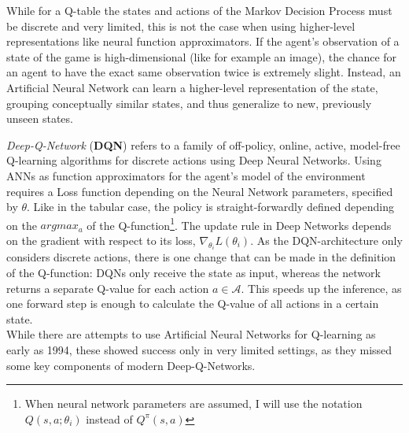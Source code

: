 While for a Q-table the states and actions of the Markov Decision Process must be discrete and very limited, this is not the case when using higher-level representations like neural function approximators. If the agent's observation of a state of the game is high-dimensional (like for example an image), the chance for an agent to have the exact same observation twice is extremely slight. Instead, an Artificial Neural Network can learn a higher-level representation of the state, grouping conceptually similar states, and thus generalize to new, previously unseen states. 

\textit{Deep-Q-Network} (\textbf{DQN}) refers to a family of off-policy, online, active, model-free Q-learning algorithms for discrete actions using Deep Neural Networks. %
Using ANNs as function approximators for the agent's model of the environment requires a Loss function depending on the Neural Network parameters, specified by $\theta$. Like in the tabular case, the policy is straight-forwardly defined depending on the $argmax_a$ of the Q-function\footnote{When neural network parameters are assumed, I will use the notation $Q(s,a;\theta_i)$ instead of $Q^\pi(s,a)$}. The update rule in Deep Networks depends on the gradient with respect to its loss, $\nabla_{\theta_i}L(\theta_i)$.  %
As the DQN-architecture only considers discrete actions, there is one change that can be made in the definition of the Q-function: DQNs only receive the state as input, whereas the network returns a separate Q-value for each action $a \in \mathcal{A}$. This speeds up the inference, as one forward step is enough to calculate the Q-value of all actions in a certain state.\\

While there are attempts to use Artificial Neural Networks for Q-learning as early as 1994\cite{rummery_-line_1994}, these showed success only in very limited settings, as they missed some key components of modern Deep-Q-Networks. 

